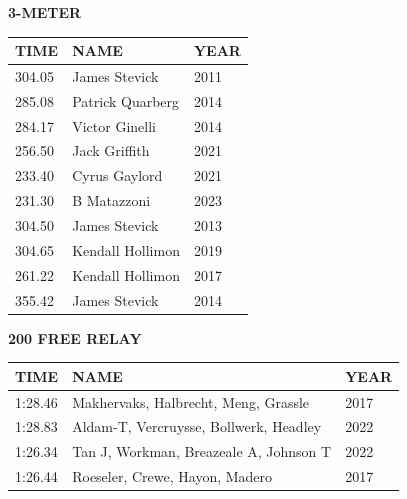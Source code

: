 \begin{table}[H]
\centering
\begin{minipage}[t]{0.6\textwidth}
\centering
\textbf{3-METER}\\[0.1cm]
\begin{tabular}{@{}p{1.8cm}p{2.8cm}p{1.2cm}@{}}
\hline
    \textbf{TIME} & \textbf{NAME} & \textbf{YEAR} \\
\hline
    304.05 & James Stevick & 2011 \\
    285.08 & Patrick Quarberg & 2014 \\
    284.17 & Victor Ginelli & 2014 \\
    256.50 & Jack Griffith & 2021 \\
    233.40 & Cyrus Gaylord & 2021 \\
    231.30 & B Matazzoni & 2023 \\
    304.50 & James Stevick & 2013 \\
    304.65 & Kendall Hollimon & 2019 \\
    261.22 & Kendall Hollimon & 2017 \\
    355.42 & James Stevick & 2014 \\
\hline
\end{tabular}
\end{minipage}
\end{table}

\begin{table}[H]
\centering
\begin{minipage}[t]{0.6\textwidth}
\centering
\textbf{200 FREE RELAY}\\[0.1cm]
\begin{tabular}{@{}p{1.8cm}p{2.8cm}p{1.2cm}@{}}
\hline
    \textbf{TIME} & \textbf{NAME} & \textbf{YEAR} \\
\hline
    1:28.46 & Makhervaks, Halbrecht, Meng, Grassle & 2017 \\
    1:28.83 & Aldam-T, Vercruysse, Bollwerk, Headley & 2022 \\
    1:26.34 & Tan J, Workman, Breazeale A, Johnson T & 2022 \\
    1:26.44 & Roeseler, Crewe, Hayon, Madero & 2017 \\
\hline
\end{tabular}
\end{minipage}
\end{table}

